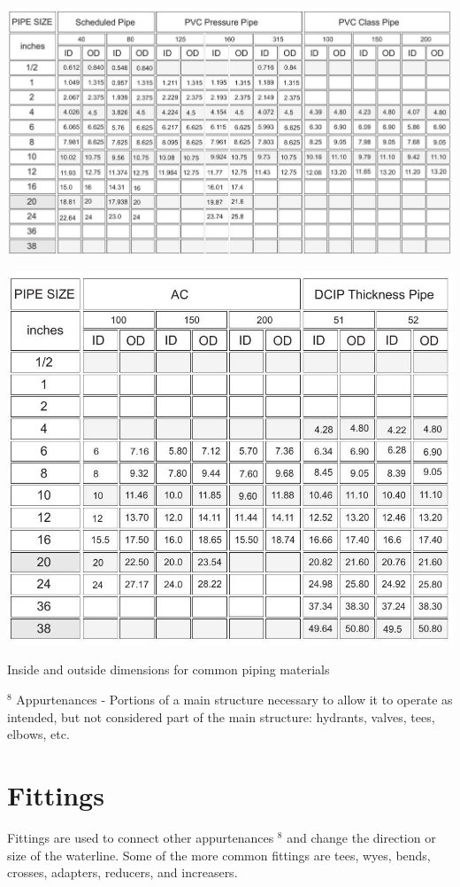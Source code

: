 \documentclass[10pt]{article}
\begin{document}
\includegraphics[max width=\textwidth]{2022_11_03_fc0cbc2f3612fab6edd2g-10}

\includegraphics[max width=\textwidth]{2022_11_03_fc0cbc2f3612fab6edd2g-10(1)}

Inside and outside dimensions for common piping materials

${ }^{8}$ Appurtenances - Portions of a main structure necessary to allow it to operate as intended, but not considered part of the main structure: hydrants, valves, tees, elbows, etc.

\section{Fittings}
Fittings are used to connect other appurtenances ${ }^{8}$ and change the direction or size of the waterline. Some of the more common fittings are tees, wyes, bends, crosses, adapters, reducers, and increasers.
\end{document}
